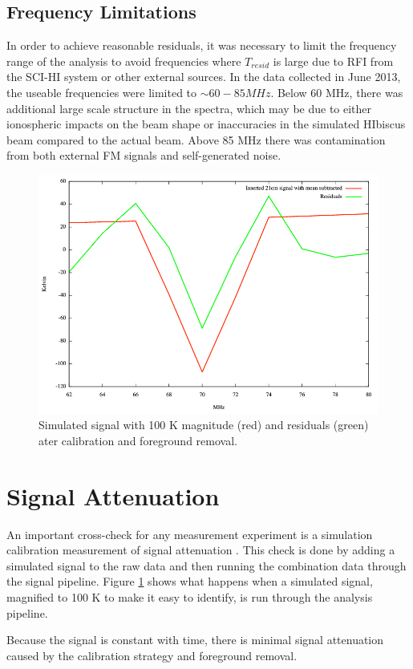 \subsection{Frequency Limitations}
In order to achieve reasonable residuals, it was necessary to limit the frequency range of the analysis to avoid frequencies where $T_{resid}$ is large due to RFI from the SCI-HI system or other external sources. In the data collected in June 2013, the useable frequencies were limited to $\sim 60-85 MHz$. Below 60 MHz, there was additional large scale structure in the spectra, which may be due to either ionospheric impacts on the beam shape or inaccuracies in the simulated HIbiscus beam compared to the actual beam. Above 85 MHz there was contamination from both external FM signals and self-generated noise. 

\begin{figure}[htb]
\begin{center}
\includegraphics[width=0.9\linewidth]{Data_analysis/figures/100_K_21cm_signal.png}
\caption{Simulated \cm signal with 100 K magnitude (red) and residuals (green) ater calibration and foreground removal. }
\label{Fig:100K_sim}
\end{center}
\end{figure}

\section{\cm Signal Attenuation}
An important cross-check for any \cm measurement experiment is a simulation calibration measurement of signal attenuation \cite{paciga_2013}. This check is done by adding a simulated \cm signal to the raw data and then running the combination data through the signal pipeline. Figure \ref{Fig:100K_sim} shows what happens when a simulated \cm signal, magnified to 100 K to make it easy to identify, is run through the analysis pipeline. 

Because the \cm signal is constant with time, there is minimal signal attenuation caused by the calibration strategy and foreground removal. 


